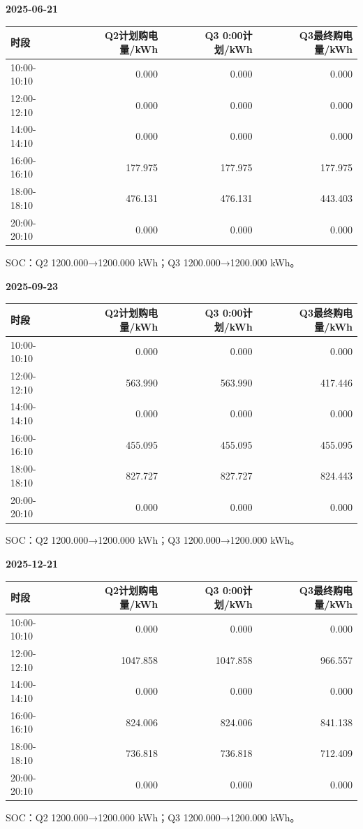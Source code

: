 \textbf{2025-06-21}
\begin{longtable}[]{@{}lrrr@{}}
\toprule
时段 & Q2计划购电量/kWh & Q3 0:00计划/kWh & Q3最终购电量/kWh \\
\midrule\endhead
10:00-10:10 & 0.000 & 0.000 & 0.000 \\
12:00-12:10 & 0.000 & 0.000 & 0.000 \\
14:00-14:10 & 0.000 & 0.000 & 0.000 \\
16:00-16:10 & 177.975 & 177.975 & 177.975 \\
18:00-18:10 & 476.131 & 476.131 & 443.403 \\
20:00-20:10 & 0.000 & 0.000 & 0.000 \\
\bottomrule\end{longtable}
SOC：Q2 1200.000→1200.000 kWh；Q3 1200.000→1200.000 kWh。

\textbf{2025-09-23}
\begin{longtable}[]{@{}lrrr@{}}
\toprule
时段 & Q2计划购电量/kWh & Q3 0:00计划/kWh & Q3最终购电量/kWh \\
\midrule\endhead
10:00-10:10 & 0.000 & 0.000 & 0.000 \\
12:00-12:10 & 563.990 & 563.990 & 417.446 \\
14:00-14:10 & 0.000 & 0.000 & 0.000 \\
16:00-16:10 & 455.095 & 455.095 & 455.095 \\
18:00-18:10 & 827.727 & 827.727 & 824.443 \\
20:00-20:10 & 0.000 & 0.000 & 0.000 \\
\bottomrule\end{longtable}
SOC：Q2 1200.000→1200.000 kWh；Q3 1200.000→1200.000 kWh。

\textbf{2025-12-21}
\begin{longtable}[]{@{}lrrr@{}}
\toprule
时段 & Q2计划购电量/kWh & Q3 0:00计划/kWh & Q3最终购电量/kWh \\
\midrule\endhead
10:00-10:10 & 0.000 & 0.000 & 0.000 \\
12:00-12:10 & 1047.858 & 1047.858 & 966.557 \\
14:00-14:10 & 0.000 & 0.000 & 0.000 \\
16:00-16:10 & 824.006 & 824.006 & 841.138 \\
18:00-18:10 & 736.818 & 736.818 & 712.409 \\
20:00-20:10 & 0.000 & 0.000 & 0.000 \\
\bottomrule\end{longtable}
SOC：Q2 1200.000→1200.000 kWh；Q3 1200.000→1200.000 kWh。

